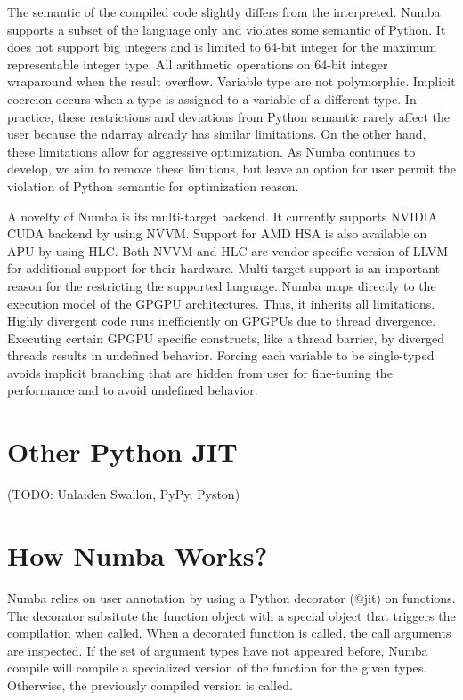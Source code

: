 \documentclass{acm_proc_article-sp}
\begin{document}
The semantic of the compiled code slightly differs
from the interpreted. Numba supports a subset of the language only
and violates some semantic of Python.  It does not support big integers
and is limited to 64-bit integer for the maximum representable integer type.
All arithmetic operations on 64-bit integer wraparound when the result
overflow.  Variable type are not polymorphic.  Implicit coercion occurs when
a type is assigned to a variable of a different type. In practice, these
restrictions and deviations from Python semantic rarely affect the user
because the ndarray already has similar limitations. On the other hand, these
limitations allow for aggressive optimization.  As Numba continues to develop,
we aim to remove these limitions, but leave an option for user permit the
violation of Python semantic for optimization reason.

A novelty of Numba is its multi-target backend.  It currently supports NVIDIA
CUDA backend by using NVVM.  Support for AMD HSA is also available on APU by
using HLC.  Both NVVM and HLC are vendor-specific version of LLVM for
additional support for their hardware.  Multi-target support is an important
reason for the restricting the supported language.
Numba maps directly to the execution model of the GPGPU architectures.
Thus, it inherits all limitations.
Highly divergent code runs inefficiently on GPGPUs due to thread divergence.
Executing certain GPGPU specific constructs, like a thread barrier, by diverged
threads results in undefined behavior. Forcing each variable to be single-typed
avoids implicit branching that are hidden from user for fine-tuning the
performance and to avoid undefined behavior.

\section{Other Python JIT}

(TODO: Unlaiden Swallon, PyPy, Pyston)

\section{How Numba Works?}

Numba relies on user annotation by using a Python decorator (@jit) on functions.
The decorator subsitute the function object with a special object that triggers
the compilation when called. When a decorated function is called,
the call arguments are inspected. If the set of argument types have not appeared
before, Numba compile will compile a specialized version of the function for the
given types. Otherwise, the previously compiled version is called.
\end{document}
